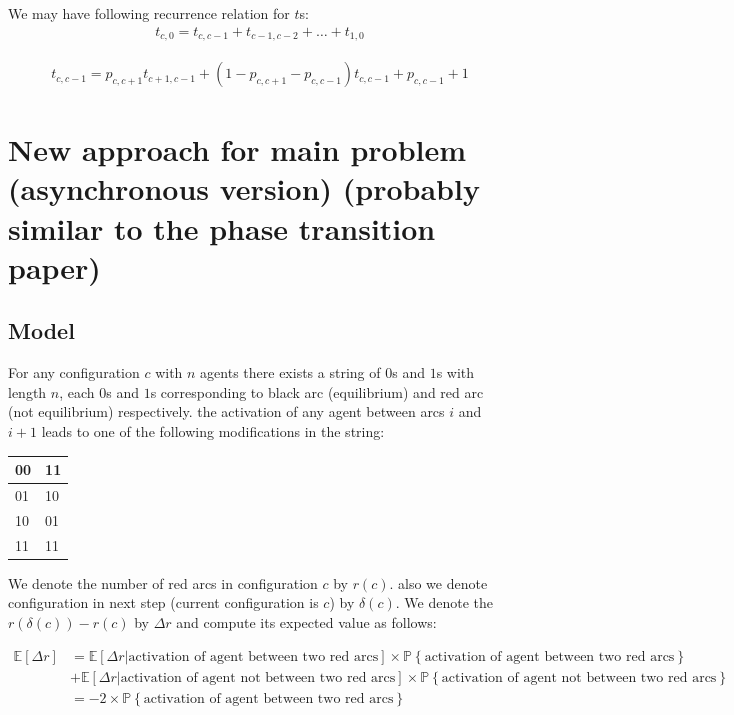 \documentclass[]{book}
\theoremstyle{definition}
\begin{document}
 We may have following recurrence relation for $t$s:
\begin{equation}
\begin{split}
    t_{c, 0} = t_{c, c-1} + t_{c-1, c-2} + \hdots + t_{1, 0}
\end{split}
\end{equation}

\begin{equation}
\begin{split}
    t_{c, c-1} = p_{c, c+1} t_{c+1, c-1} + \left( 1 - p_{c, c+1} - p_{c, c-1} \right) t_{c, c-1} + p_{c, c-1} + 1
\end{split}
\end{equation}


\section{New approach for main problem (asynchronous version) (probably similar to the phase transition paper)}
\subsection{Model}
For any configuration \emph{$c$} with $n$ agents there exists a string of $0$s and $1$s with length $n$, each $0$s and $1$s corresponding to black arc (equilibrium) and red arc (not equilibrium) respectively.
the activation of any agent between arcs $i$ and $i+1$ leads to one of the following modifications in the string:
\begin{center}
    \begin{table}[ht]
        \begin{tabular}{|l|l|}
        \hline
        00 & 11 \\ \hline
        01 & 10 \\ \hline
        10 & 01 \\ \hline
        11 & 11 \\ \hline
        \end{tabular}
    \end{table}
\end{center}

We denote the number of red arcs in configuration $c$ by $r(c)$. also we denote configuration in next step (current configuration is $c$) by $\delta(c)$.
We denote the $r(\delta(c)) - r(c)$ by $\Delta r$ and compute its expected value as follows:

\begin{equation}
\begin{split}
    \mathbb{E}[\Delta r] &= \mathbb{E}[\Delta r | \text{activation of agent between two red arcs}] \times \mathbb{P}\left\{ \text{activation of agent between two red arcs} \right\} \\
    &+ \mathbb{E}[\Delta r | \text{activation of agent not between two red arcs}] \times \mathbb{P}\left\{ \text{activation of agent not between two red arcs} \right\} \\
    &= -2\times \mathbb{P}\left\{ \text{activation of agent between two red arcs} \right\}
\end{split}
\end{equation}
\end{document}
